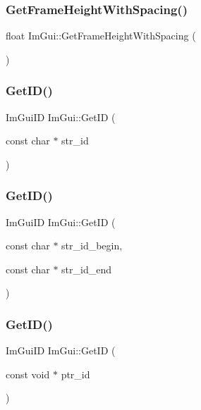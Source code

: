 \subsubsection{\texorpdfstring{Get\+Frame\+Height\+With\+Spacing()}{GetFrameHeightWithSpacing()}}
{\footnotesize\ttfamily float Im\+Gui\+::\+Get\+Frame\+Height\+With\+Spacing (\begin{DoxyParamCaption}{ }\end{DoxyParamCaption})}

\hypertarget{namespace_im_gui_a3329b04bd4235e90ad9deb00ffb38ae4}{}\label{namespace_im_gui_a3329b04bd4235e90ad9deb00ffb38ae4} 
\subsubsection{\texorpdfstring{Get\+I\+D()}{GetID()}\hspace{0.1cm}{\footnotesize\ttfamily [1/3]}}
{\footnotesize\ttfamily Im\+Gui\+ID Im\+Gui\+::\+Get\+ID (\begin{DoxyParamCaption}\item[{const char $\ast$}]{str\+\_\+id }\end{DoxyParamCaption})}

\hypertarget{namespace_im_gui_a26064d74efebef3aa86e1a78b3e4c333}{}\label{namespace_im_gui_a26064d74efebef3aa86e1a78b3e4c333} 
\subsubsection{\texorpdfstring{Get\+I\+D()}{GetID()}\hspace{0.1cm}{\footnotesize\ttfamily [2/3]}}
{\footnotesize\ttfamily Im\+Gui\+ID Im\+Gui\+::\+Get\+ID (\begin{DoxyParamCaption}\item[{const char $\ast$}]{str\+\_\+id\+\_\+begin,  }\item[{const char $\ast$}]{str\+\_\+id\+\_\+end }\end{DoxyParamCaption})}

\hypertarget{namespace_im_gui_a220123ad62c2180ded92b2ef91f27c5a}{}\label{namespace_im_gui_a220123ad62c2180ded92b2ef91f27c5a} 
\subsubsection{\texorpdfstring{Get\+I\+D()}{GetID()}\hspace{0.1cm}{\footnotesize\ttfamily [3/3]}}
{\footnotesize\ttfamily Im\+Gui\+ID Im\+Gui\+::\+Get\+ID (\begin{DoxyParamCaption}\item[{const void $\ast$}]{ptr\+\_\+id }\end{DoxyParamCaption})}

